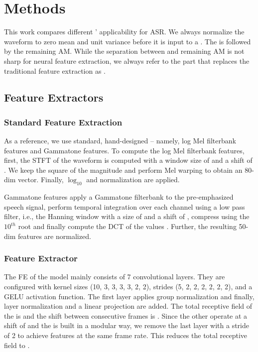 \documentclass{INTERSPEECH2023}
\begin{document}
\section{Methods}
This work compares different \fes' applicability for \gls{ASR}.
We always normalize the waveform to zero mean and unit variance before it is input to a \fe.
The \fe is followed by the remaining \gls{AM}.
While the separation between \fe and remaining \gls{AM} is not sharp for neural feature extraction, we always refer to the part that replaces the traditional feature extraction as \fe.

\subsection{Feature Extractors}
\subsubsection{Standard Feature Extraction}
As a reference, we use standard, hand-designed \fes -- namely, log Mel filterbank features and Gammatone features.
To compute the log Mel filterbank features, first, the \gls{STFT} of the waveform is computed with a window size of  and a shift of .
We keep the square of the magnitude and perform Mel warping to obtain an 80-dim vector.
Finally, $\log_{10}$ and normalization are applied.

Gammatone features apply a Gammatone filterbank to the pre-emphasized speech signal, perform temporal integration over each channel using a low pass filter, i.e., the Hanning window with a size of  and a shift of , compress using the $10^{th}$ root and finally compute the \gls{DCT} of the values \cite{schlueter:icassp07}.
Further, the resulting 50-dim features are normalized.

\subsubsection{\wvtwo Feature Extractor}
The \gls{FE} of the \wvtwo model \cite{facebook2020wav2vec2} mainly consists of 7 convolutional layers.
They are configured with kernel sizes (10, 3, 3, 3, 3, 2, 2), strides (5, 2, 2, 2, 2, 2, 2), and a GELU activation function.
The first layer applies group normalization and finally, layer normalization and a linear projection are added.
The total receptive field of the \wvtwo \fe is  and the shift between consecutive frames is .
Since the other \fes operate at a shift of  and the \wvtwo \fe is built in a modular way, we remove the last layer with a stride of 2 to achieve features at the same frame rate.
This reduces the total receptive field to .
\end{document}
